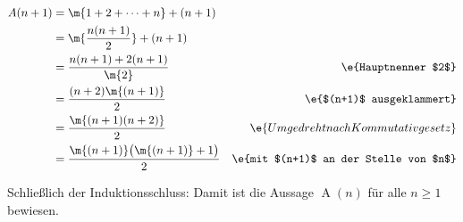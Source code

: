 \documentclass{lehramt-informatik-aufgabe}
\begin{document}
\begin{align*}
A(n+1)
& = \m{1 + 2 + \cdots + n} + (n + 1) \\
%
& = \m{\frac{n(n + 1)}{2}} + (n + 1) \\
%
&
= \frac{n(n+1)+2(n+1)}{\m{2}} &
\e{Hauptnenner $2$}\\
%
&
= \frac{(n+2)\m{(n+1)}}{2} &
\e{$(n+1)$ ausgeklammert} \\
%
&
= \frac{\m{(n+1)(n+2)}}{2} &
\e{Umgedreht nach Kommutativgesetz} \\
%
&
= \frac{\m{(n+1)}\bigl(\m{(n+1)}+1\bigr)}{2} &
\e{mit $(n+1)$ an der Stelle von $n$}\\
\end{align*}

\bigskip

\noindent
Schließlich der Induktionsschluss: Damit ist die Aussage
$\operatorname{A}(n)$ für alle $n \geq 1$ bewiesen.

\end{document}
